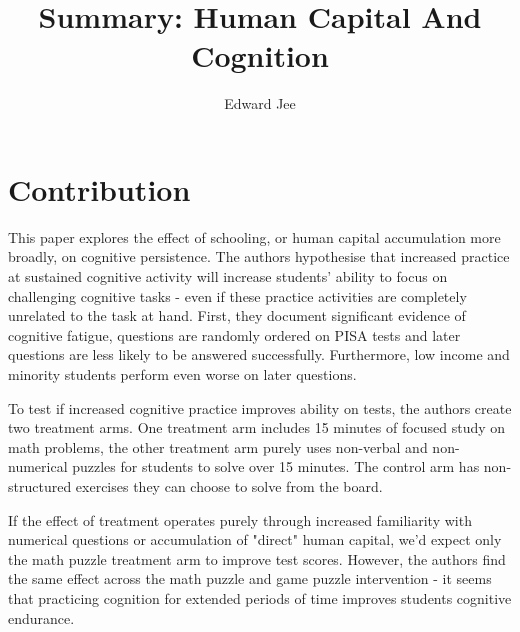 \documentclass{article}
\author{Edward Jee}
\title{
    Summary: Human Capital And Cognition 
}
\begin{document}
\maketitle

\section{Contribution}





This paper explores the effect of schooling, or human capital accumulation more 
broadly, on cognitive persistence. The authors hypothesise that increased practice 
at sustained cognitive activity will increase students' ability to focus on 
challenging cognitive tasks - even if these practice activities are completely unrelated 
to the task at hand. First, they document significant evidence of cognitive fatigue,
questions are randomly ordered on PISA tests and later questions are less likely 
to be answered successfully. Furthermore, low income and minority students perform 
even worse on later questions.


To test if increased cognitive practice improves ability on tests, the authors 
create two treatment arms. One treatment arm includes 15 minutes of focused study on math 
problems, the other treatment arm purely uses non-verbal and non-numerical 
puzzles for students to solve over 15 minutes. The control arm has non-structured 
exercises they can choose to solve from the board.


If the effect of treatment operates purely through increased familiarity with 
numerical questions or accumulation of "direct" human capital, we'd expect only 
the math puzzle treatment arm to improve test scores. However, the authors find the 
same effect across the math puzzle and game puzzle intervention - it seems that 
practicing cognition for extended periods of time improves students cognitive 
endurance.



    
\end{document}
